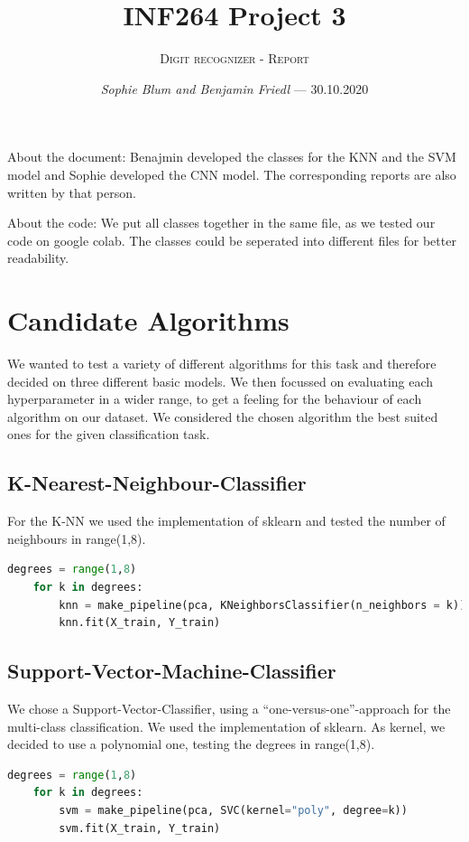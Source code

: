 \documentclass[12pt,a4paper]{scrartcl}		%
\newcommand\svthema{INF264 Project 3}
\newcommand\svperson{Sophie Blum and Benjamin Friedl}
\newcommand\svdatum{30.10.2020}
\newcommand\lvname{Digit recognizer - Report}
\begin{document}
\title{ \svthema}
\author{\textsc{\lvname}}
\date{ \small \textsl{\svperson} --- \svdatum }
\maketitle

\abstract
About the document:
Benajmin developed the classes for the KNN and the SVM model and Sophie developed the CNN model. 
The corresponding reports are also written by that person.

About the code:
We put all classes together in the same file, as we tested our code on google colab. The classes 
could be seperated into different files for better readability.

\section{Candidate Algorithms}
    We wanted to test a variety of different algorithms for this task and therefore decided on three different 
    basic models. We then focussed on evaluating each hyperparameter in a wider range, to get a feeling for the behaviour 
    of each algorithm on our dataset.
    We considered the chosen algorithm the best suited ones for the given classification task.

    \subsection{K-Nearest-Neighbour-Classifier}
        For the K-NN we used the implementation of sklearn and tested the number of neighbours in range(1,8).  
\begin{lstlisting}[language=Python]
    degrees = range(1,8)
    for k in degrees:
        knn = make_pipeline(pca, KNeighborsClassifier(n_neighbors = k))
        knn.fit(X_train, Y_train)
\end{lstlisting}

    \subsection{Support-Vector-Machine-Classifier}
        We chose a Support-Vector-Classifier, using a “one-versus-one”-approach for the multi-class classification. 
        We used the implementation of sklearn. As kernel, we decided to use a polynomial one, testing the degrees in range(1,8). 

\begin{lstlisting}[language=Python]
    degrees = range(1,8)
    for k in degrees:
        svm = make_pipeline(pca, SVC(kernel="poly", degree=k))
        svm.fit(X_train, Y_train)
\end{lstlisting}
\end{document}
